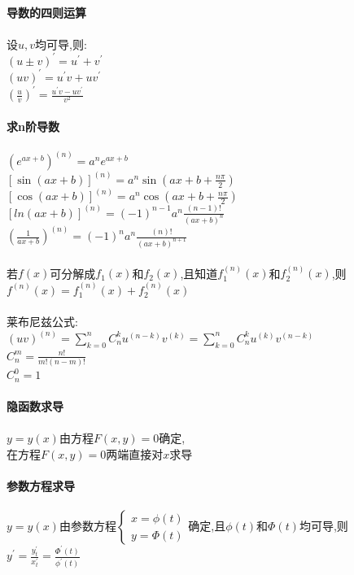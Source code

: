 \documentclass{article}
\begin{document}
\begin{flushleft}
	~\\ \textbf{导数的四则运算}\\~\\
	
	设$u,v$均可导,则:\\
	$(u\pm v)^{'}=u^{'}+v^{'}$\\
	$(uv)^{'}=u^{'}v+uv^{'}$\\
	$(\frac{u}{v})^{'}=\frac{u^{'}v-uv^{'}}{v^2}$\\
	
	~\\ \textbf{求n阶导数}\\~\\
	
	$(e^{ax+b})^{(n)}=a^ne^{ax+b}$\\
	$[\sin(ax+b)]^{(n)}=a^n\sin(ax+b+\frac{n\pi}{2})$\\
	$[\cos(ax+b)]^{(n)}=a^n\cos(ax+b+\frac{n\pi}{2})$\\
	$[ln(ax+b)]^{(n)}=(-1)^{n-1}a^n\frac{(n-1)!}{(ax+b)^n}$\\
	$(\frac{1}{ax+b})^{(n)}=(-1)^{n}a^n\frac{(n)!}{(ax+b)^{n+1}}$\\
	~\\
	若$f(x)$可分解成$f_1(x)$和$f_2(x)$,且知道$f_1^{(n)}(x)$和$f_2^{(n)}(x)$,则$f^{(n)}(x)=f_1^{(n)}(x)+f_2^{(n)}(x)$\\
	~\\
	莱布尼兹公式:\\
	$(uv)^{(n)} = \sum\limits_{k=0}^{n} C_n^k u^{(n-k)} v^{(k)} = \sum\limits_{k=0}^{n} C_n^k u^{(k)} v^{(n-k)}$\\
	$C_n^m=\frac{n!}{m!(n-m)!}$\\
	$C_n^0=1$\\
	
	~\\ \textbf{隐函数求导}\\~\\
	
	$y=y(x)$由方程$F(x,y)=0$确定,\\
	在方程$F(x,y)=0$两端直接对$x$求导\\
	
	~\\ \textbf{参数方程求导}\\~\\
	
	$y=y(x)$由参数方程$\left\{
	\begin{array}{rcl}
	x=\phi(t)\\
	y=\Phi(t)
	\end{array} \right.$确定,且$\phi(t)$和$\Phi(t)$均可导,则$y^{'}=\frac{y^{'}_t}{x^{'}_t}=\frac{\Phi^{'}(t)}{\phi^{'}(t)}$\\
	

\end{flushleft}
\end{document}
